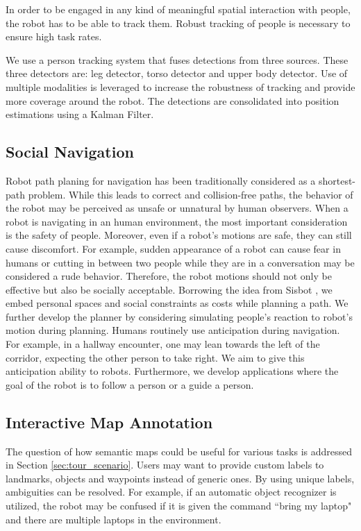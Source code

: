 In order to be engaged in any kind of meaningful spatial interaction with people, the robot has to be able to track them. Robust tracking of people is necessary to ensure high task rates.

We use a person tracking system that fuses detections from three sources. These three detectors are: leg detector, torso detector and upper body detector. Use of multiple modalities is leveraged to increase the robustness of tracking and provide more coverage around the robot. The detections are consolidated into position estimations using a Kalman Filter.

\subsection{Social Navigation}

Robot path planing for navigation has been traditionally considered as a shortest-path problem. While this leads to correct and collision-free paths, the behavior of the robot may be perceived as unsafe or unnatural by human observers. When a robot is navigating in an human environment, the most important consideration is the safety of people. Moreover, even if a robot's motions are safe, they can still cause discomfort. For example, sudden appearance of a robot can cause fear in humans or cutting in between two people while they are in a conversation may be considered a rude behavior. Therefore, the robot motions should not only be effective but also be socially acceptable.
Borrowing the idea from Sisbot \cite{sisbot2007human}, we embed personal spaces and social constraints as costs while planning a path. We further develop the planner by considering simulating people's reaction to robot's motion during planning. Humans routinely use anticipation during navigation. For example, in a hallway encounter, one may lean towards the left of the corridor, expecting the other person to take right. We aim to give this anticipation ability to robots. Furthermore, we develop applications where the goal of the robot is to follow a person or a guide a person.

\subsection{Interactive Map Annotation}

The question of how semantic maps could be useful for various tasks is addressed in Section \ref{sec:tour_scenario}. Users may want to provide custom labels to landmarks, objects and waypoints instead of generic ones. By using unique labels, ambiguities can be resolved. For example, if an automatic object recognizer is utilized, the robot may be confused if it is given the command ``bring my laptop" and there are multiple laptops in the environment.

